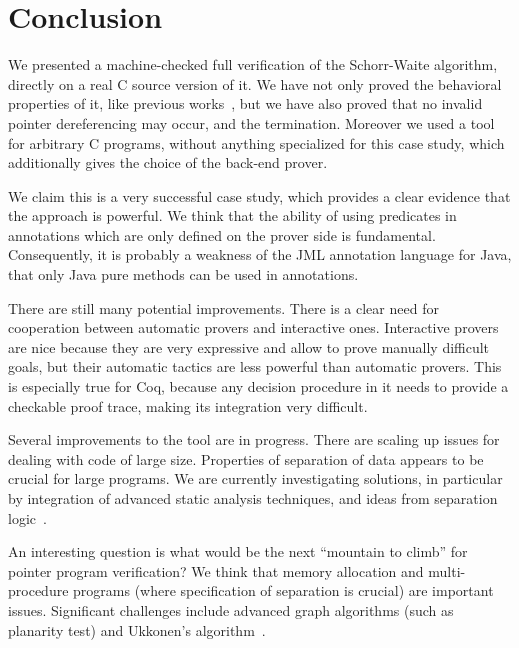 \section{Conclusion}
\label{sec:conclusion}

We presented a machine-checked full verification of the Schorr-Waite
algorithm, directly on a real C source version of it. We have not only
proved the behavioral properties of it, like previous
works~\cite{bornat00mpc,mehta03cade}, but we have also proved that no
invalid pointer dereferencing may occur, and the
termination. Moreover we used a tool for arbitrary C programs, without
anything specialized for this case study, which additionally gives the
choice of the back-end prover.

We claim this is a very successful case study, which provides a clear
evidence that the \caduceus{} approach is powerful. We think that the
ability of using predicates in annotations which are only defined on
the prover side is fundamental. Consequently, it is probably a
weakness of the JML annotation language for Java, that only Java
pure methods can be used in annotations.

There are still many potential improvements. There is a clear
need for cooperation between automatic provers and interactive ones.
Interactive provers are nice because they are very expressive and
allow to prove manually difficult goals, but their automatic tactics
are less powerful than automatic provers. This is especially true for
Coq, because any decision procedure in it needs to provide a checkable
proof trace, making its integration very difficult.

Several improvements to the \caduceus{} tool are in progress. There are
scaling up issues for dealing with code of large size. Properties of
separation of data appears to be crucial for large programs. We are
currently investigating solutions, in particular by integration of
advanced static analysis techniques, and ideas from separation
logic~\cite{reynolds02lics}.

An interesting question is what would be the next ``mountain to
climb'' for pointer program verification? We think that
memory allocation and multi-procedure programs (where specification of
separation is crucial) are important issues. Significant challenges
include advanced graph algorithms (such as planarity test) and
Ukkonen's algorithm~\cite{ukkonen95}.


